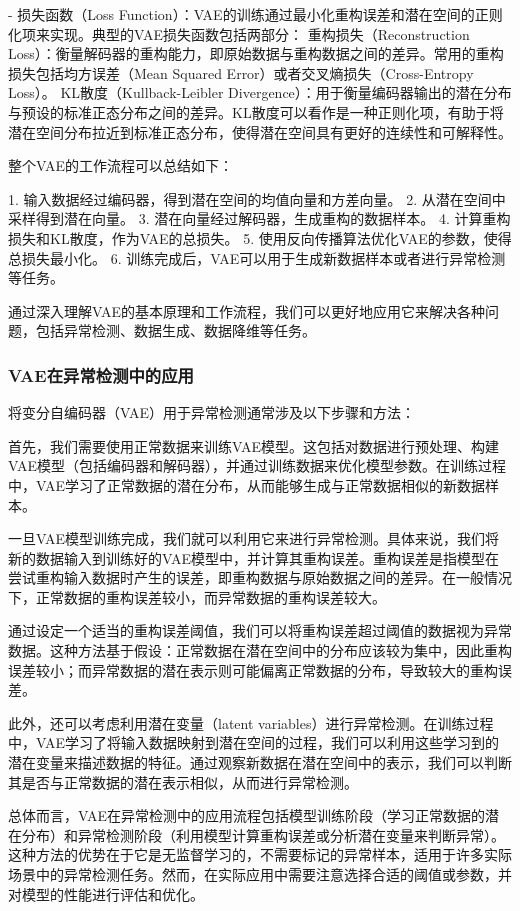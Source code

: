 - 损失函数（Loss Function）：VAE的训练通过最小化重构误差和潜在空间的正则化项来实现。典型的VAE损失函数包括两部分：
重构损失（Reconstruction Loss）：衡量解码器的重构能力，即原始数据与重构数据之间的差异。常用的重构损失包括均方误差（Mean Squared Error）或者交叉熵损失（Cross-Entropy Loss）。
KL散度（Kullback-Leibler Divergence）：用于衡量编码器输出的潜在分布与预设的标准正态分布之间的差异。KL散度可以看作是一种正则化项，有助于将潜在空间分布拉近到标准正态分布，使得潜在空间具有更好的连续性和可解释性。

整个VAE的工作流程可以总结如下：

1. 输入数据经过编码器，得到潜在空间的均值向量和方差向量。
2. 从潜在空间中采样得到潜在向量。
3. 潜在向量经过解码器，生成重构的数据样本。
4. 计算重构损失和KL散度，作为VAE的总损失。
5. 使用反向传播算法优化VAE的参数，使得总损失最小化。
6. 训练完成后，VAE可以用于生成新数据样本或者进行异常检测等任务。

通过深入理解VAE的基本原理和工作流程，我们可以更好地应用它来解决各种问题，包括异常检测、数据生成、数据降维等任务。

\subsubsection{VAE在异常检测中的应用}

将变分自编码器（VAE）用于异常检测通常涉及以下步骤和方法：

首先，我们需要使用正常数据来训练VAE模型。这包括对数据进行预处理、构建VAE模型（包括编码器和解码器），并通过训练数据来优化模型参数。在训练过程中，VAE学习了正常数据的潜在分布，从而能够生成与正常数据相似的新数据样本。

一旦VAE模型训练完成，我们就可以利用它来进行异常检测。具体来说，我们将新的数据输入到训练好的VAE模型中，并计算其重构误差。重构误差是指模型在尝试重构输入数据时产生的误差，即重构数据与原始数据之间的差异。在一般情况下，正常数据的重构误差较小，而异常数据的重构误差较大。

通过设定一个适当的重构误差阈值，我们可以将重构误差超过阈值的数据视为异常数据。这种方法基于假设：正常数据在潜在空间中的分布应该较为集中，因此重构误差较小；而异常数据的潜在表示则可能偏离正常数据的分布，导致较大的重构误差。

此外，还可以考虑利用潜在变量（latent variables）进行异常检测。在训练过程中，VAE学习了将输入数据映射到潜在空间的过程，我们可以利用这些学习到的潜在变量来描述数据的特征。通过观察新数据在潜在空间中的表示，我们可以判断其是否与正常数据的潜在表示相似，从而进行异常检测。

总体而言，VAE在异常检测中的应用流程包括模型训练阶段（学习正常数据的潜在分布）和异常检测阶段（利用模型计算重构误差或分析潜在变量来判断异常）。这种方法的优势在于它是无监督学习的，不需要标记的异常样本，适用于许多实际场景中的异常检测任务。然而，在实际应用中需要注意选择合适的阈值或参数，并对模型的性能进行评估和优化。

